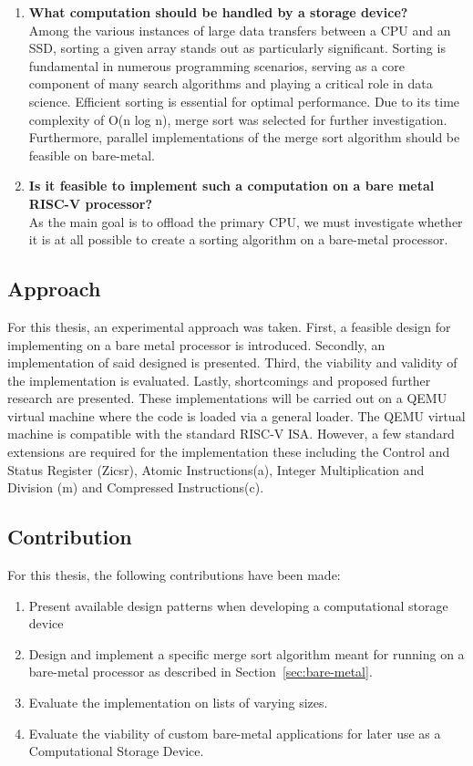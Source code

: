 \begin{enumerate}
  \item {\large \textbf{What computation should be handled by a storage
    device?}}\label{sec:computational} \\
    Among the various instances of large data transfers between a CPU and an SSD,
    sorting a given array stands out as particularly significant. Sorting is
    fundamental in numerous programming scenarios, serving as a core component of
    many search algorithms and playing a critical role in data science. Efficient
    sorting is essential for optimal performance. Due to its time complexity of O(n
    log n), merge sort was selected for further investigation. Furthermore, parallel
    implementations of the merge sort algorithm should be feasible on
    bare-metal.
  \item {\large \textbf{ Is it feasible to implement such a computation on a
    bare metal RISC-V processor?}} \\
    As the main goal is to offload the primary CPU, we must investigate whether
    it is at all possible to create a sorting algorithm on a
    bare-metal processor.
\end{enumerate}


\subsection{Approach}\label{sec:approach}
For this thesis, an experimental approach was taken. First, a feasible design
for implementing on a bare metal processor is introduced. Secondly, an
implementation of said designed is presented. Third, the viability and validity
of the implementation is evaluated. Lastly, shortcomings and proposed further
research are presented. These implementations will be carried out on a QEMU
virtual machine where the code is loaded via a general loader. The QEMU virtual
machine is compatible with the standard RISC-V ISA. However, a few standard
extensions are required for the implementation these including the Control and
Status Register (Zicsr), Atomic Instructions(a), Integer Multiplication and
Division (m) and Compressed Instructions(c).

\subsection{Contribution}
For this thesis, the following contributions have been made:
\begin{enumerate}
  \item Present available design patterns when developing a computational
    storage device
  \item Design and implement a specific merge sort algorithm meant for running on a
    bare-metal processor as described in Section~\ref{sec:bare-metal}.
  \item Evaluate the implementation on lists of varying sizes.
  \item Evaluate the viability of custom bare-metal applications for later use
    as a Computational Storage Device.
\end{enumerate}


